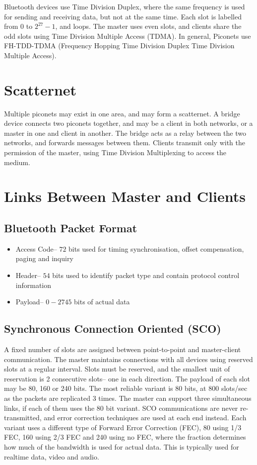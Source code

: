 Bluetooth devices use Time Division Duplex, where the same frequency is used for sending and receiving data, but not at
 the same time. Each slot is labelled from $0$ to $2^{27} - 1$, and loops. The master uses even slots, and clients share
 the odd slots using Time Division Multiple Access (TDMA). In general, Piconets use FH-TDD-TDMA (Frequency Hopping Time
 Division Duplex Time Division Multiple Access).

\section*{Scatternet}

Multiple piconets may exist in one area, and may form a scatternet. A bridge device connects two piconets together, and
 may be a client in both networks, or a master in one and client in another. The bridge acts as a relay between the two
 networks, and forwards messages between them. Clients transmit only with the permission of the master, using Time
 Division Multiplexing to access the medium.

\section*{Links Between Master and Clients}

\subsection*{Bluetooth Packet Format}

\begin{itemize}
  \item Access Code-- $72$ bits used for timing synchronisation, offset compensation, paging and inquiry
  \item Header-- $54$ bits used to identify packet type and contain protocol control information
  \item Payload-- $0-2745$ bits of actual data
\end{itemize}

\subsection*{Synchronous Connection Oriented (SCO)}

A fixed number of slots are assigned between point-to-point and master-client communication. The master maintains
 connections with all devices using reserved slots at a regular interval. Slots must be reserved, and the smallest unit
 of reservation is 2 consecutive slots-- one in each direction. The payload of each slot may be 80, 160 or 240 bits.
 The most reliable variant is 80 bits, at 800 slots/sec as the packets are replicated 3 times. The master can support
 three simultaneous links, if each of them uses the 80 bit variant. SCO communications are never re-transmitted, and
 error correction techniques are used at each end instead. Each variant uses a different type of Forward Error
 Correction (FEC), 80 using 1/3 FEC, 160 using 2/3 FEC and 240 using no FEC, where the fraction determines how much
 of the bandwidth is used for actual data. This is typically used for realtime data, video and audio.

